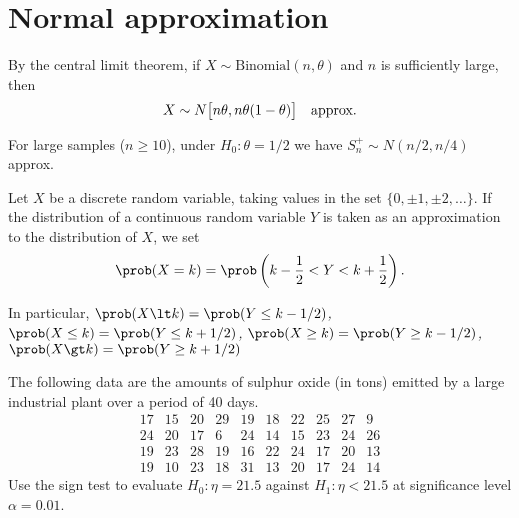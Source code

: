 \section{Normal approximation}
By the central limit theorem, if $X\sim\text{Binomial}(n,\theta)$ and $n$ is sufficiently large, then 
\[
X\sim N\big[n\theta,n\theta(1-\theta)\big] \text{\quad approx.}
\]

For large samples ($n\geq 10$), under $H_0:\theta=1/2$ we have $S^{+}_n\sim N(n/2,n/4)$ approx.

%
%
%
\begin{definition}
Let $X$ be a discrete random variable, taking values in the set $\{0,\pm 1,\pm 2,\ldots\}$. If the distribution of a continuous random variable $Y$ is taken as an approximation to the distribution of $X$, we set
\[
\prob(X=k) = \prob\left(k - \frac{1}{2} < Y < k + \frac{1}{2}\right).
\] 
\end{definition}

\vspace*{-1ex}In particular,
\bit
\it $\prob(X\lt  k) = \prob(Y\leq k-1/2)$, 
\it $\prob(X\leq k) = \prob(Y\leq k+1/2)$,
\it $\prob(X\geq k) = \prob(Y\geq k-1/2)$,
\it $\prob(X\gt  k) = \prob(Y\geq k+1/2)$
\eit


\begin{example}
The following data are the amounts of sulphur oxide (in tons) emitted by a large industrial plant over a period of 40 days.
\[\begin{array}{cccccccccc}
17 & 15 & 20 & 29 & 19 & 18 & 22 & 25 & 27 &  9 \\
24 & 20 & 17 &  6 & 24 & 14 & 15 & 23 & 24 & 26 \\
19 & 23 & 28 & 19 & 16 & 22 & 24 & 17 & 20 & 13 \\
19 & 10 & 23 & 18 & 31 & 13 & 20 & 17 & 24 & 14
\end{array}\]
Use the sign test to evaluate $H_0:\eta=21.5$ against $H_1:\eta<21.5$ at significance level $\alpha=0.01$.
\end{example}

